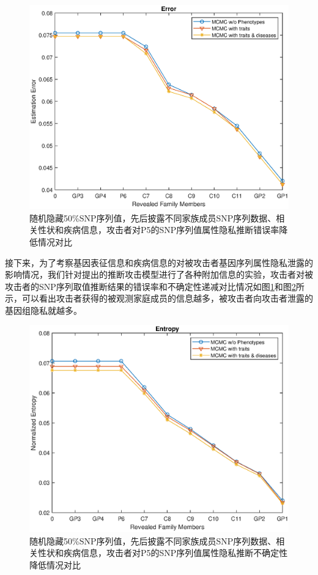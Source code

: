 \begin{figure}[htbp]
	\centering
	\includegraphics[width=0.8\linewidth]{./figures/P5error2.eps}
	\centering
	\caption{随机隐藏50\%SNP序列值，先后披露不同家族成员SNP序列数据、相关性状和疾病信息，攻击者对P5的SNP序列值属性隐私推断错误率降低情况对比}\label{fig:P5error2}
\end{figure}


接下来，为了考察基因表征信息和疾病信息的对被攻击者基因序列属性隐私泄露的影响情况，我们针对提出的推断攻击模型进行了各种附加信息的实验，攻击者对被攻击者的SNP序列取值推断结果的错误率和不确定性递减对比情况如图\ref{fig:P5error2}和图\ref{fig:P5entropy2}所示，可以看出攻击者获得的被观测家庭成员的信息越多，被攻击者向攻击者泄露的基因组隐私就越多。

\begin{figure}[htbp]
	\centering
	\includegraphics[width=0.8\linewidth]{./figures/P5entropy2.eps}
	\centering
	\caption{随机隐藏50\%SNP序列值，先后披露不同家族成员SNP序列数据、相关性状和疾病信息，攻击者对P5的SNP序列值属性隐私推断不确定性降低情况对比}\label{fig:P5entropy2}
\end{figure}


